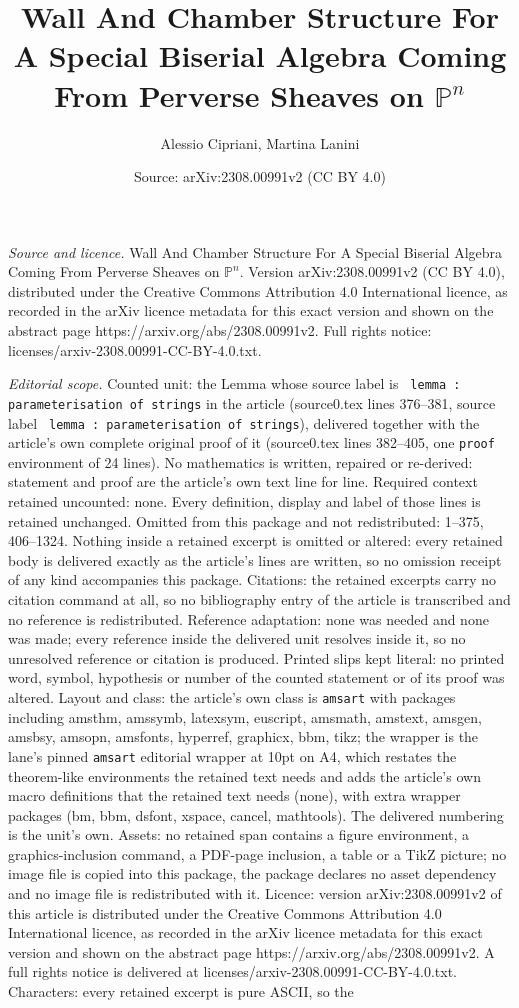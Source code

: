 \documentclass[10pt,a4paper]{amsart}
\title[Wall And Chamber Structure For A Special Biserial Algebra Co]{Wall And Chamber Structure For A Special Biserial Algebra Coming From Perverse Sheaves on $\mathbb{P}^n$}
\author{Alessio Cipriani, Martina Lanini}
\date{Source: arXiv:2308.00991v2 (CC BY 4.0)}
\begin{document}
\maketitle

\noindent\emph{Source and licence.} Wall And Chamber Structure For A Special Biserial Algebra Coming From Perverse Sheaves on $\mathbb{P}^n$. Version arXiv:2308.00991v2 (CC BY 4.0), distributed under the Creative Commons Attribution 4.0 International licence, as recorded in the arXiv licence metadata for this exact version and shown on the abstract page https://arxiv.org/abs/2308.00991v2. Full rights notice: licenses/arxiv-2308.00991-CC-BY-4.0.txt.\par\smallskip

\noindent\textit{Editorial scope.} Counted unit: the Lemma whose source label is \texttt{ lemma : parameterisation of strings} in the article (source0.tex lines 376--381, source label \texttt{ lemma : parameterisation of strings}), delivered together with the article's own complete original proof of it (source0.tex lines 382--405, one \texttt{proof} environment of 24 lines). No mathematics is written, repaired or re-derived: statement and proof are the article's own text line for line. Required context retained uncounted: none. Every definition, display and label of those lines is retained unchanged. Omitted from this package and not redistributed: 1--375, 406--1324. Nothing inside a retained excerpt is omitted or altered: every retained body is delivered exactly as the article's lines are written, so no omission receipt of any kind accompanies this package. Citations: the retained excerpts carry no citation command at all, so no bibliography entry of the article is transcribed and no reference is redistributed. Reference adaptation: none was needed and none was made; every reference inside the delivered unit resolves inside it, so no unresolved reference or citation is produced. Printed slips kept literal: no printed word, symbol, hypothesis or number of the counted statement or of its proof was altered. Layout and class: the article's own class is \texttt{amsart} with packages including amsthm, amssymb, latexsym, euscript, amsmath, amstext, amsgen, amsbsy, amsopn, amsfonts, hyperref, graphicx, bbm, tikz; the wrapper is the lane's pinned \texttt{amsart} editorial wrapper at 10pt on A4, which restates the theorem-like environments the retained text needs and adds the article's own macro definitions that the retained text needs (none), with extra wrapper packages (bm, bbm, dsfont, xspace, cancel, mathtools). The delivered numbering is the unit's own. Assets: no retained span contains a figure environment, a graphics-inclusion command, a PDF-page inclusion, a table or a TikZ picture; no image file is copied into this package, the package declares no asset dependency and no image file is redistributed with it. Licence: version arXiv:2308.00991v2 of this article is distributed under the Creative Commons Attribution 4.0 International licence, as recorded in the arXiv licence metadata for this exact version and shown on the abstract page https://arxiv.org/abs/2308.00991v2. A full rights notice is delivered at licenses/arxiv-2308.00991-CC-BY-4.0.txt. Characters: every retained excerpt is pure ASCII, so the 
\end{document}
